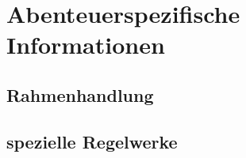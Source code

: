 \section*{Abenteuerspezifische Informationen}

\subsection*{Rahmenhandlung}

\subsection*{spezielle Regelwerke}
